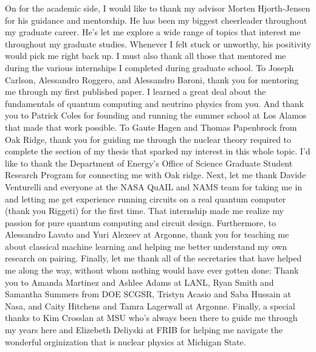 \documentclass[Dual]{msu-thesis}
\begin{document}
\quad On for the academic side, I would like to thank my advisor Morten Hjorth-Jensen for his guidance and mentorship. He has been my biggest cheerleader throughout my graduate career. He's let me explore a wide range of topics that interest me throughout my graduate studies. Whenever I felt stuck or unworthy, his positivity would pick me right back up. I must also thank all those that mentored me during the various internships I completed during graduate school. To Joseph Carlson, Alessandro Roggero, and Alessandro Baroni, thank you for mentoring me through my first published paper. I learned a great deal about the fundamentals of quantum computing and neutrino physics from you. And thank you to Patrick Coles for founding and running the summer school at Los Alamos that made that work possible. To Gaute Hagen and Thomas Papenbrock from Oak Ridge, thank you for guiding me through the nuclear theory required to complete the section of my thesis that sparked my interest in this whole topic. I'd like to thank the Department of Energy's Office of Science Graduate Student Research Program for connecting me with Oak ridge. Next, let me thank Davide Venturelli and everyone at the NASA QuAIL and NAMS team for taking me in and letting me get experience running circuits on a real quantum computer (thank you Riggeti) for the first time. That internship made me realize my passion for pure quantum computing and circuit design. Furthermore, to Alessandro Lavato and Yuri Alexeev at Argonne, thank you for teaching me about classical machine learning and helping me better understand my own research on pairing. Finally, let me thank all of the secretaries that have helped me along the way, without whom nothing would have ever gotten done: Thank you to Amanda Martinez and Ashlee Adams at LANL, Ryan Smith and Samantha Summers from DOE SCGSR, Tristyn Acasio and Saba Hussain at Nasa, and Caity Hitchens and Tamra Lagerwall at Argonne. Finally, a special thanks to  Kim Crosslan at MSU who's always been there to guide me through my years here and Elizebeth Deliyski at FRIB for helping me navigate the wonderful orginization that is nuclear physics at Michigan State.

\clearpage
\SingleSpacing
\tableofcontents* %
\clearpage
\clearpage
\listoffigures %
%
%
\mainmatter
%
\end{document}
